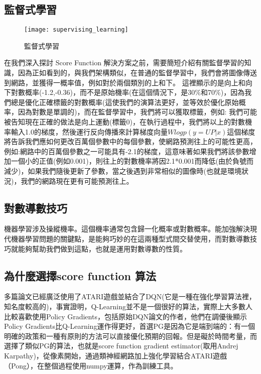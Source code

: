 \subsection{監督式學習}
\begin{figure}[hbt!]
\begin{center}
\texttt{[image: supervising\_learning]}
\caption{監督式學習}
\end{center}
\end{figure}

 在我們深入探討 Score Function 解決方案之前，需要簡短介紹有關監督學習的知識，因為正如看到的，與我們架構類似，在普通的監督學習中，我們會將圖像傳送到網路，並獲得一概率值，例如對於兩個類別的上和下。 這裡顯示的是向上和向下對數概率(-1.2,-0.36)，而不是原始機率(在這個情況下，是30$\%$和70$\%$)，因為我們總是優化正確標籤的對數概率(這使我們的演算法更好，並等效於優化原始概率，因為對數是單調的)，而在監督學習中，我們將可以獲取標籤，例如:
我們可能被告知現在正確的做法是向上運動(標籤0)，在執行過程中，我們將以上的對數機率輸入1.0的梯度，然後運行反向傳播來計算梯度向量$Wlogp(y=UP|x)$這個梯度將告訴我們應如何更改百萬個參數中的每個參數，使網路預測往上的可能性更高，例如:網路中的百萬個參數之一可能具有-2.1的梯度，這意味著如果我們將該參數增加一個小的正值(例如0.001)，則往上的對數機率將因2.1*0.001而降低(由於負號而減少)，如果我們隨後更新了參數，當之後遇到非常相似的圖像時(也就是環境狀況)，我們的網路現在更有可能預測往上。\\

\subsection{對數導數技巧}
 機器學習涉及操縱機率。這個機率通常包含歸一化概率或對數概率。能加強解決現代機器學習問題的關鍵點，是能夠巧妙的在這兩種型式間交替使用，而對數導數技巧就能夠幫助我們做到這點，也就是運用對數導數的性質。\\
 
\subsection{為什麼選擇score function 算法}
 多篇論文已經廣泛使用了ATARI遊戲並結合了DQN(它是一種在強化學習算法裡，知名度較高的)，事實證明，Q-Learning並不是一個很好的算法，實際上大多數人比較喜歡使用Policy Gradients，包括原始DQN論文的作者，他們在調優後顯示Policy Gradients比Q-Learning運作得更好，首選PG是因為它是端到端的：有一個明確的政策和一種有原則的方法可以直接優化預期的回報。但是礙於時間考量，而選擇了類似PG的算法，也就是score function gradient estimator(取用Andrej Karpathy)，從像素開始，通過類神經網路加上強化學習結合ATARI遊戲（Pong），在整個過程使用numpy運算，作為訓練工具。\\ 
 
